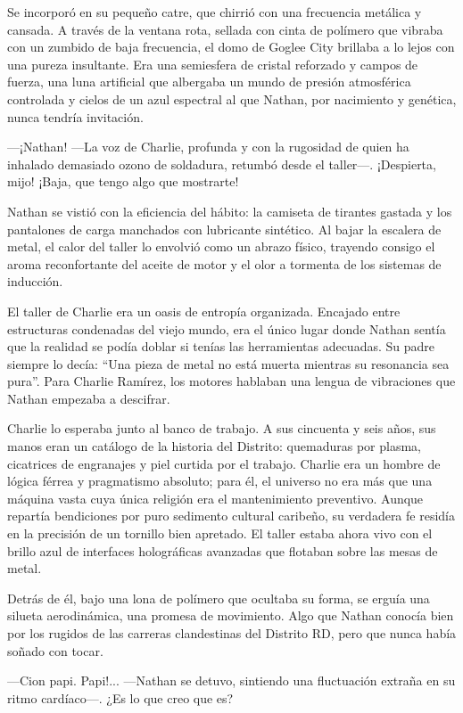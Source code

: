 \documentclass[12pt,a4paper]{book}
\begin{document}
Se incorporó en su pequeño catre, que chirrió con una frecuencia metálica y cansada. A través de la ventana rota, sellada con cinta de polímero que vibraba con un zumbido de baja frecuencia, el domo de Goglee City brillaba a lo lejos con una pureza insultante. Era una semiesfera de cristal reforzado y campos de fuerza, una luna artificial que albergaba un mundo de presión atmosférica controlada y cielos de un azul espectral al que Nathan, por nacimiento y genética, nunca tendría invitación.

---¡Nathan! ---La voz de Charlie, profunda y con la rugosidad de quien ha inhalado demasiado ozono de soldadura, retumbó desde el taller---. ¡Despierta, mijo! ¡Baja, que tengo algo que mostrarte!

Nathan se vistió con la eficiencia del hábito: la camiseta de tirantes gastada y los pantalones de carga manchados con lubricante sintético. Al bajar la escalera de metal, el calor del taller lo envolvió como un abrazo físico, trayendo consigo el aroma reconfortante del aceite de motor y el olor a tormenta de los sistemas de inducción.

El taller de Charlie era un oasis de entropía organizada. Encajado entre estructuras condenadas del viejo mundo, era el único lugar donde Nathan sentía que la realidad se podía doblar si tenías las herramientas adecuadas. Su padre siempre lo decía: ``Una pieza de metal no está muerta mientras su resonancia sea pura''. Para Charlie Ramírez, los motores hablaban una lengua de vibraciones que Nathan empezaba a descifrar.

Charlie lo esperaba junto al banco de trabajo. A sus cincuenta y seis años, sus manos eran un catálogo de la historia del Distrito: quemaduras por plasma, cicatrices de engranajes y piel curtida por el trabajo. Charlie era un hombre de lógica férrea y pragmatismo absoluto; para él, el universo no era más que una máquina vasta cuya única religión era el mantenimiento preventivo. Aunque repartía bendiciones por puro sedimento cultural caribeño, su verdadera fe residía en la precisión de un tornillo bien apretado. El taller estaba ahora vivo con el brillo azul de interfaces holográficas avanzadas que flotaban sobre las mesas de metal.

Detrás de él, bajo una lona de polímero que ocultaba su forma, se erguía una silueta aerodinámica, una promesa de movimiento. Algo que Nathan conocía bien por los rugidos de las carreras clandestinas del Distrito RD, pero que nunca había soñado con tocar.

---Cion papi. Papi!... ---Nathan se detuvo, sintiendo una fluctuación extraña en su ritmo cardíaco---. ¿Es lo que creo que es?
\end{document}
